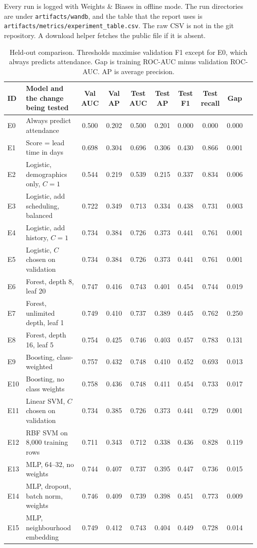 \documentclass[journal]{IEEEtran}
\begin{document}
Every run is logged with Weights \& Biases in offline mode. The run directories are under \texttt{artifacts/wandb}, and the table that the report uses is \texttt{artifacts/metrics/experiment\_table.csv}. The raw CSV is not in the git repository. A download helper fetches the public file if it is absent.

\begin{table}[t]
\caption{Held-out comparison. Thresholds maximise validation F1 except for E0, which always predicts attendance. Gap is training ROC-AUC minus validation ROC-AUC. AP is average precision.}
\label{tab:experiments}
\centering
\footnotesize
\begin{tabular}{llcccccccc}
\toprule
ID & Model and the change being tested & Val AUC & Val AP & Test AUC & Test AP & Test F1 & Test recall & Gap \\
\midrule
E0 & Always predict attendance & 0.500 & 0.202 & 0.500 & 0.201 & 0.000 & 0.000 & 0.000 \\
E1 & Score = lead time in days & 0.698 & 0.304 & 0.696 & 0.306 & 0.430 & 0.866 & 0.001 \\
E2 & Logistic, demographics only, $C=1$ & 0.544 & 0.219 & 0.539 & 0.215 & 0.337 & 0.834 & 0.006 \\
E3 & Logistic, add scheduling, balanced & 0.722 & 0.349 & 0.713 & 0.334 & 0.438 & 0.731 & 0.003 \\
E4 & Logistic, add history, $C=1$ & 0.734 & 0.384 & 0.726 & 0.373 & 0.441 & 0.761 & 0.001 \\
E5 & Logistic, $C$ chosen on validation & 0.734 & 0.384 & 0.726 & 0.373 & 0.441 & 0.761 & 0.001 \\
E6 & Forest, depth 8, leaf 20 & 0.747 & 0.416 & 0.743 & 0.401 & 0.454 & 0.744 & 0.019 \\
E7 & Forest, unlimited depth, leaf 1 & 0.749 & 0.410 & 0.737 & 0.389 & 0.445 & 0.762 & 0.250 \\
E8 & Forest, depth 16, leaf 5 & 0.754 & 0.425 & 0.746 & 0.403 & 0.457 & 0.783 & 0.131 \\
E9 & Boosting, class-weighted & 0.757 & 0.432 & 0.748 & 0.410 & 0.452 & 0.693 & 0.013 \\
E10 & Boosting, no class weights & 0.758 & 0.436 & 0.748 & 0.411 & 0.454 & 0.733 & 0.017 \\
E11 & Linear SVM, $C$ chosen on validation & 0.734 & 0.385 & 0.726 & 0.373 & 0.441 & 0.729 & 0.001 \\
E12 & RBF SVM on 8{,}000 training rows & 0.711 & 0.343 & 0.712 & 0.338 & 0.436 & 0.828 & 0.119 \\
E13 & MLP, 64--32, no weights & 0.744 & 0.407 & 0.737 & 0.395 & 0.447 & 0.736 & 0.015 \\
E14 & MLP, dropout, batch norm, weights & 0.746 & 0.409 & 0.739 & 0.398 & 0.451 & 0.773 & 0.009 \\
E15 & MLP, neighbourhood embedding & 0.749 & 0.412 & 0.743 & 0.404 & 0.449 & 0.728 & 0.014 \\
\bottomrule
\end{tabular}
\end{table}
\end{document}
